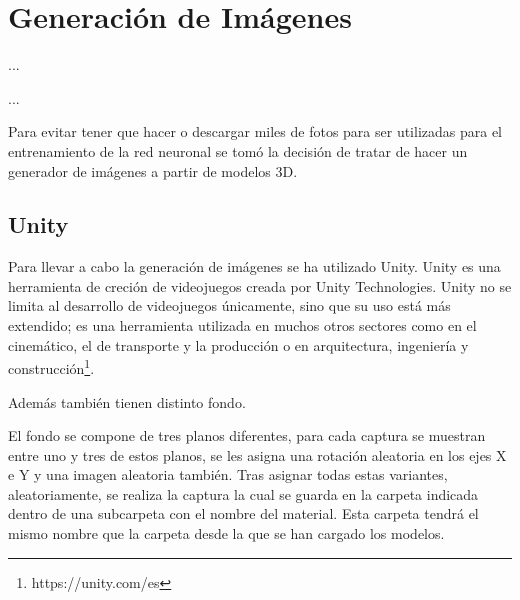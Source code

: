 %
%

\chapter{Generación de Imágenes}

\begin{FraseCelebre}
\begin{Frase}
...
\end{Frase}
\begin{Fuente}
...
\end{Fuente}
\end{FraseCelebre}

\begin{resumen}
Para evitar tener que hacer o descargar miles de fotos para ser utilizadas para el entrenamiento de la red neuronal se tomó la decisión de tratar de hacer un generador de imágenes a partir de modelos 3D.
\end{resumen}


\section{Unity}
\label{cap3:sec:unity}

Para llevar a cabo la generación de imágenes se ha utilizado Unity.
Unity es una herramienta de creción de videojuegos creada por Unity Technologies. Unity no se limita al desarrollo de videojuegos únicamente, sino que su uso está más extendido; es una herramienta utilizada en muchos otros sectores como en el cinemático, el de transporte y la producción o en arquitectura, ingeniería y construcción\footnote{https://unity.com/es}.



 Además también tienen distinto fondo.

El fondo se compone de tres planos diferentes, para cada captura se muestran entre uno y tres de estos planos, se les asigna una rotación aleatoria en los ejes X e Y y una imagen aleatoria también. Tras asignar todas estas variantes, aleatoriamente, se realiza la captura la cual se guarda en la carpeta indicada dentro de una subcarpeta con el nombre del material. Esta carpeta tendrá el mismo nombre que la carpeta desde la que se han cargado los modelos. 

